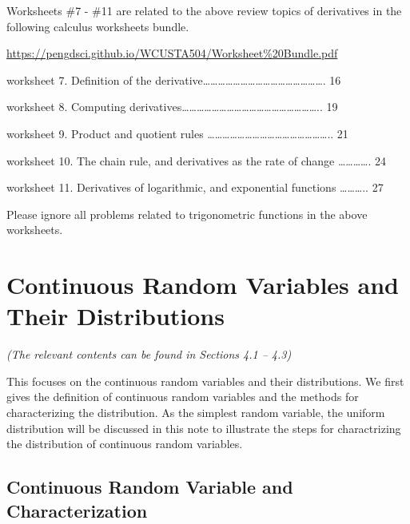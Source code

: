 \documentclass[
]{book}
\begin{document}
\hfill\break

Worksheets \#7 - \#11 are related to the above review topics of derivatives in the following calculus worksheets bundle.

\url{https://pengdsci.github.io/WCUSTA504/Worksheet\%20Bundle.pdf}

\hfill\break

worksheet 7. Definition of the derivative\ldots\ldots\ldots\ldots\ldots\ldots\ldots\ldots\ldots\ldots\ldots\ldots\ldots\ldots\ldots\ldots. 16

worksheet 8. Computing derivatives\ldots\ldots\ldots\ldots\ldots\ldots\ldots\ldots\ldots\ldots\ldots\ldots\ldots\ldots\ldots\ldots\ldots\ldots.. 19

worksheet 9. Product and quotient rules \ldots\ldots\ldots\ldots\ldots\ldots\ldots\ldots\ldots\ldots\ldots\ldots\ldots\ldots\ldots\ldots.. 21

worksheet 10. The chain rule, and derivatives as the rate of change \ldots\ldots\ldots\ldots. 24

worksheet 11. Derivatives of logarithmic, and exponential functions \ldots\ldots\ldots.. 27

Please ignore all problems related to trigonometric functions in the above worksheets.

\hfill\break

\hypertarget{continuous-random-variables-and-their-distributions}{%
\chapter{Continuous Random Variables and Their Distributions}\label{continuous-random-variables-and-their-distributions}}

\emph{(The relevant contents can be found in Sections 4.1 -- 4.3)}

\hfill\break

This focuses on the continuous random variables and their distributions. We first gives the definition of continuous random variables and the methods for characterizing the distribution. As the simplest random variable, the uniform distribution will be discussed in this note to illustrate the steps for charactrizing the distribution of continuous random variables.

\hypertarget{continuous-random-variable-and-characterization}{%
\section{Continuous Random Variable and Characterization}\label{continuous-random-variable-and-characterization}}
\end{document}
